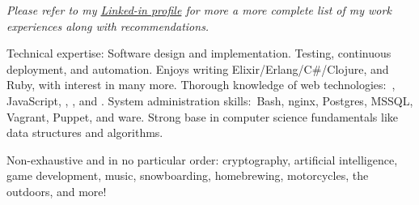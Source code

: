 \documentclass[10pt,a4paper]{article}
\begin{document}
\vspace{-0.2em}
\begin{center}
  \emph{\small Please refer to my \href{http://www.linkedin.com/in/gotbones}{Linked-in profile} for more a more complete list of my work experiences along with recommendations.}
\end{center}


\spacedhrule{-0.2em}{-0.4em}


\inlineheadsection  %
  {Technical expertise:}
  {Software design and implementation. Testing, continuous deployment, and automation. Enjoys writing Elixir/\nsp Erlang/\nsp C\#/\nsp Clojure, and Ruby, with interest in many more. Thorough knowledge of web technologies:\ , JavaScript, , , and . System administration skills:\ Bash, nginx, Postgres, MSSQL, Vagrant, Puppet, and ware. Strong base in computer science fundamentals like data structures and algorithms.}


\inlineheadsection
  {Non-exhaustive and in no particular order:}
  {cryptography, artificial intelligence, game development, music, snowboarding, homebrewing, motorcycles, the outdoors, and more!}
\end{document}
